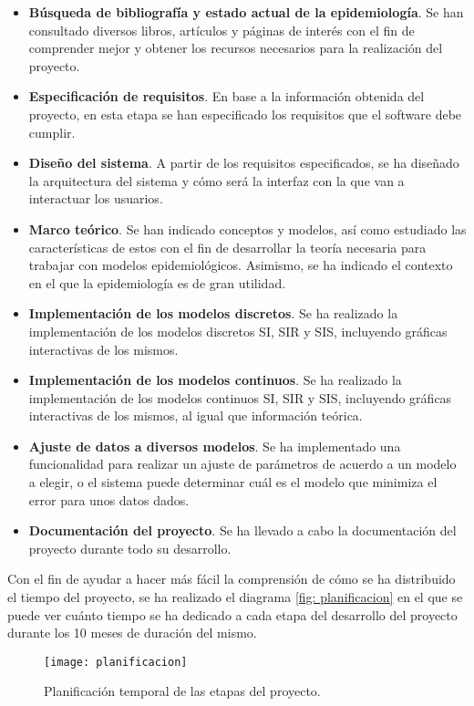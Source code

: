 \begin{itemize}
\item \textbf{Búsqueda de bibliografía y estado actual de la epidemiología}. Se han consultado diversos libros, artículos y páginas de interés con el fin de comprender mejor y obtener los recursos necesarios para la realización del proyecto.
\item \textbf{Especificación de requisitos}. En base a la información obtenida del proyecto, en esta etapa se han especificado los requisitos que el software debe cumplir.
\item \textbf{Diseño del sistema}. A partir de los requisitos especificados, se ha diseñado la arquitectura del sistema y cómo será la interfaz con la que van a interactuar los usuarios.
\item \textbf{Marco teórico}. Se han indicado conceptos y modelos, así como estudiado las características de estos con el fin de desarrollar la teoría necesaria para trabajar con modelos epidemiológicos. Asimismo, se ha indicado el contexto en el que la epidemiología es de gran utilidad.
\item \textbf{Implementación de los modelos discretos}. Se ha realizado la implementación de los modelos discretos SI, SIR y SIS, incluyendo gráficas interactivas de los mismos.
\item \textbf{Implementación de los modelos continuos}. Se ha realizado la implementación de los modelos continuos SI, SIR y SIS, incluyendo gráficas interactivas de los mismos, al igual que información teórica.
\item \textbf{Ajuste de datos a diversos modelos}. Se ha implementado una funcionalidad para realizar un ajuste de parámetros de acuerdo a un modelo a elegir, o el sistema puede determinar cuál es el modelo que minimiza el error para unos datos dados.
\item \textbf{Documentación del proyecto}. Se ha llevado a cabo la documentación del proyecto durante todo su desarrollo.
\end{itemize}

Con el fin de ayudar a hacer más fácil la comprensión de cómo se ha distribuido el tiempo del proyecto, se ha realizado el diagrama \eqref{fig: planificacion} en el que se puede ver cuánto tiempo se ha dedicado a cada etapa del desarrollo del proyecto durante los 10 meses de duración del mismo.

\begin{figure}[!h]
\begin{center}
\caption{Planificación temporal de las etapas del proyecto.}
\label{fig: planificacion}
\texttt{[image: planificacion]}
\end{center}
\end{figure}


